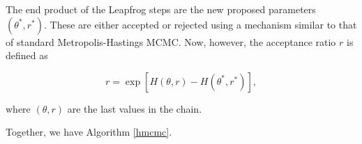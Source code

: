 \documentclass[12pt]{article}
\begin{document}
    The end product of the Leapfrog steps are the new proposed parameters $(\theta^*,r^*)$. These are either accepted or rejected using a mechanism similar to that of standard Metropolis-Hastings MCMC. Now, however, the acceptance ratio $r$ is defined as

    \begin{equation}
        r = \exp \left[ H(\theta,r) - H(\theta^*,r^*) \right],
    \end{equation}

    where $(\theta,r)$ are the last values in the chain.

    Together, we have Algorithm \ref{hmcmc}.

    \begin{algorithm}[H]

        \BlankLine

        \DontPrintSemicolon


        \BlankLine

\end{algorithm}
\end{document}
